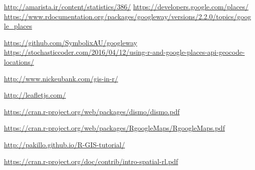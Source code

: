 \begin{thebibliography}{8}
\latin
\url{http://amarista.ir/content/statistics/386/}
\url{https://developers.google.com/places/}
\url{https://www.rdocumentation.org/packages/googleway/versions/2.2.0/topics/google_places}

\url{https://github.com/SymbolixAU/googleway}
\url{https://stochasticcoder.com/2016/04/12/using-r-and-google-places-api-geocode-locations/}

\url{http://www.nickeubank.com/gis-in-r/}

\url{http://leafletjs.com/}

\url{https://cran.r-project.org/web/packages/dismo/dismo.pdf}

\url{https://cran.r-project.org/web/packages/RgoogleMaps/RgoogleMaps.pdf}


\url{http://pakillo.github.io/R-GIS-tutorial/}

\url{https://cran.r-project.org/doc/contrib/intro-spatial-rl.pdf}


\end{thebibliography}




